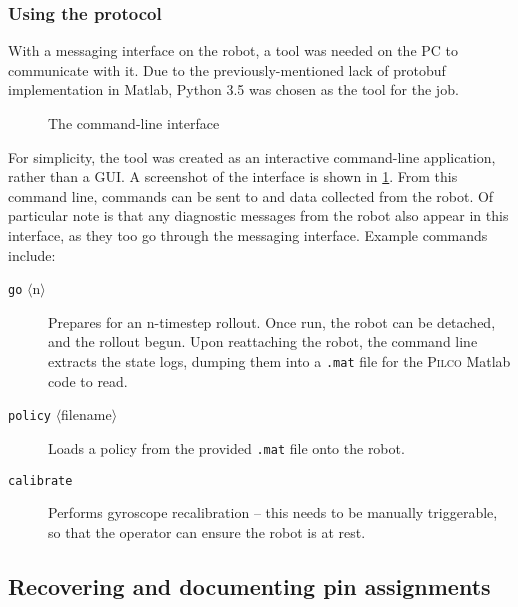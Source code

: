 \documentclass[main.tex]{subfiles}
\begin{document}

	\subsubsection{Using the protocol}

		With a messaging interface on the robot, a tool was needed on the PC to communicate with it.
		Due to the previously-mentioned lack of protobuf implementation in Matlab, Python 3.5 was chosen as the tool for the job.

		\begin{figure}
			\caption{The command-line interface}
			\label{fig:cli}
		\end{figure}

		For simplicity, the tool was created as an interactive command-line application, rather than a GUI.
		A screenshot of the interface is shown in \cref{fig:cli}.
		From this command line, commands can be sent to and data collected from the robot.
		Of particular note is that any diagnostic messages from the robot also appear in this interface, as they too go through the messaging interface. Example commands include:
		\begin{description}
			\item[\texttt{go} $\langle$n$\rangle$]
				Prepares for an n-timestep rollout. Once run, the robot can be detached, and the rollout begun. Upon reattaching the robot, the command line extracts the state logs, dumping them into a \texttt{.mat} file for the \textsc{Pilco} Matlab code to read.
			\item[\texttt{policy}  $\langle$filename$\rangle$]
				Loads a policy from the provided \texttt{.mat} file onto the robot.
			\item[\texttt{calibrate}]
				Performs gyroscope recalibration -- this needs to be manually triggerable, so that the operator can ensure the robot is at rest.
		\end{description}

\subsection{Recovering and documenting pin assignments}
	\label{sec:pins}
\end{document}
